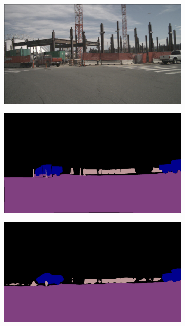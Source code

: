 \begin{figure}[htbp]
    \centering
    \begin{subfigure}[b]{0.3\textwidth}
        \includegraphics[width=\textwidth]{images/methodology/raw/original_image_2.png} 
        \caption{}
        \label{fig:semantic_masks_a}
    \end{subfigure}
    \hfill
    \begin{subfigure}[b]{0.3\textwidth}
        \includegraphics[width=\textwidth]{images/methodology/semantic_colored/2_target_color.png}
        \caption{}
        \label{fig:semantic_masks_b}
    \end{subfigure}
    \hfill
    \begin{subfigure}[b]{0.3\textwidth}
        \includegraphics[width=\textwidth]{images/methodology/semantic_colored/2_inference_color.png}
        \caption{}
        \label{fig:semantic_masks_c}
    \end{subfigure}


\end{figure}
